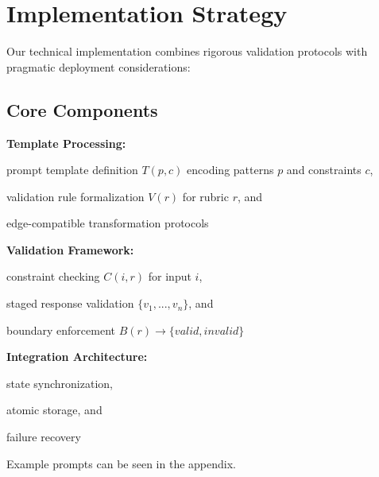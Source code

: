 \documentclass[sigconf]{acmart}
\begin{document}
\section{Implementation Strategy}

Our technical implementation combines rigorous validation protocols with pragmatic deployment considerations:

\subsection{Core Components}

\begin{enumerate*}
    \item \textbf{Template Processing:}
        \begin{enumerate*}
            \item prompt template definition $T(p, c)$ encoding patterns $p$ and constraints $c$,
            \item validation rule formalization $V(r)$ for rubric $r$, and
            \item edge-compatible transformation protocols
        \end{enumerate*}
    \item \textbf{Validation Framework:}
        \begin{enumerate*}
            \item constraint checking $C(i, r)$ for input $i$,
            \item staged response validation $\{v_1,...,v_n\}$, and
            \item boundary enforcement $B(r) \rightarrow \{valid, invalid\}$
        \end{enumerate*}
    \item \textbf{Integration Architecture:}
        \begin{enumerate*}
            \item state synchronization,
            \item atomic storage, and
            \item failure recovery
        \end{enumerate*}
\end{enumerate*}

Example prompts can be seen in the appendix.
\end{document}
